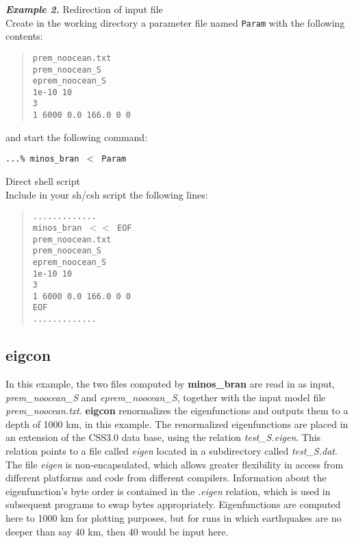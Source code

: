 \newpage
{\bf\emph{Example 2.}} Redirection of input file \\
Create in the working directory a parameter file named {\tt Param} with
the following contents:
\begin{quote}
\texttt{prem\_noocean.txt \\
prem\_noocean\_S \\
eprem\_noocean\_S \\
1e-10 10 \\
3 \\
1 6000 0.0 166.0 0 0 }
\end{quote}
and start the following command:

\texttt{...\% minos\_bran $<$ Param}


 Direct shell script \\
Include in your sh/csh script the following lines:
\begin{quote}
\texttt{............. \\
minos\_bran $<<$ EOF \\
prem\_noocean.txt \\
prem\_noocean\_S \\
eprem\_noocean\_S \\
1e-10 10 \\
3 \\
1 6000 0.0 166.0 0 0 \\
EOF \\
............. }
\end{quote}

\newpage
%
%

\subsection{eigcon}

In this example, the two files computed by {\bf minos\_bran} are read in as input,
{\it prem\_noocean\_S} and {\it eprem\_noocean\_S},
together with the input model file {\it prem\_noocean.txt}. {\bf eigcon} renormalizes
the eigenfunctions and outputs them to a depth of 1000 km, in this example. The
renormalized eigenfunctions are placed in an extension of the CSS3.0 data base,
using the relation {\it test\_S.eigen}. This relation points to a file called {\it eigen}
located in a subdirectory called {\it test\_S.dat}. The file {\it eigen} is non-encapsulated,
which allows greater flexibility in access from different platforms and code  from
different compilers. Information about the eigenfunction's byte order is contained
in the {\it .eigen} relation, which is used in subsequent programs to swap bytes appropriately.
Eigenfunctions are computed here to 1000 km for plotting purposes, but for runs
in which earthquakes are no deeper than say 40 km, then 40 would be input here.


